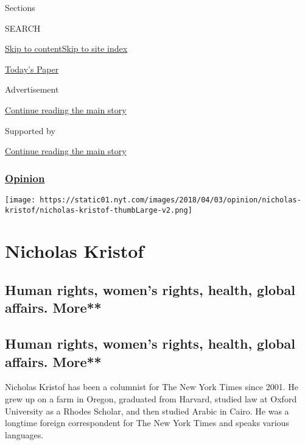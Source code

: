 Sections

SEARCH

\protect\hyperlink{site-content}{Skip to
content}\protect\hyperlink{site-index}{Skip to site index}

\href{https://myaccount.nytimes.com/auth/login?response_type=cookie\&client_id=vi}{}

\href{https://www.nytimes.com/section/todayspaper}{Today's Paper}

Advertisement

\protect\hyperlink{after-top}{Continue reading the main story}

Supported by

\protect\hyperlink{after-sponsor}{Continue reading the main story}

\hypertarget{opinion}{%
\subsubsection{\texorpdfstring{\href{/section/opinion}{Opinion}}{Opinion}}\label{opinion}}

\texttt{[image: https://static01.nyt.com/images/2018/04/03/opinion/nicholas-kristof/nicholas-kristof-thumbLarge-v2.png]}

\hypertarget{nicholas-kristof}{%
\section{Nicholas Kristof}\label{nicholas-kristof}}

\hypertarget{human-rights-womens-rights-health-global-affairs-more}{%
\subsection{Human rights, women's rights, health, global affairs.
More**}\label{human-rights-womens-rights-health-global-affairs-more}}

\hypertarget{human-rights-womens-rights-health-global-affairs-more-1}{%
\subsection{Human rights, women's rights, health, global affairs.
More**}\label{human-rights-womens-rights-health-global-affairs-more-1}}

Nicholas Kristof has been a columnist for The New York Times since 2001.
He grew up on a farm in Oregon, graduated from Harvard, studied law at
Oxford University as a Rhodes Scholar, and then studied Arabic in Cairo.
He was a longtime foreign correspondent for The New York Times and
speaks various languages.

